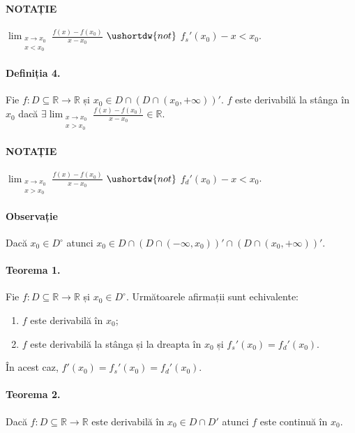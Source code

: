 \paragraph{NOTAȚIE}
$\displaystyle\lim_{\substack{x \rightarrow x_{0} \\ x<x_{0}}} \frac{f(x) - f(x_{0})}{x-x_{0}}$ $\ushortdw{not}$ $f_{s}'(x_{0})-x < x_{0}$.

\paragraph{Definiția 4.}
Fie $f:D \subseteq \mathbb{R} \rightarrow \mathbb{R}$ și $x_{0} \in D \cap (D \cap (x_{0}, +\infty))'$. $f$ este derivabilă la stânga în $x_{0}$ dacă
$\exists \displaystyle\lim_{\substack{x \rightarrow x_{0} \\ x>x_{0}}} \frac{f(x) - f(x_{0})}{x-x_{0}} \in \mathbb{R}$.

\paragraph{NOTAȚIE}
$\displaystyle\lim_{\substack{x \rightarrow x_{0} \\ x>x_{0}}} \frac{f(x) - f(x_{0})}{x-x_{0}}$ $\ushortdw{not}$ $f_{d}'(x_{0})-x < x_{0}$.

\paragraph{Observație}
Dacă $x_{0} \in D^{\circ}$ atunci $x_{0} \in D \cap (D \cap (-\infty, x_{0}))' \cap (D \cap (x_{0}, +\infty))'$.

\paragraph{Teorema 1.}
Fie $f:D \subseteq \mathbb{R} \rightarrow \mathbb{R}$ și $x_{0} \in D^{\circ}$. Următoarele afirmații sunt echivalente:
\begin{enumerate}[label=\emph{\alph*})]
	\item $f$ este derivabilă în $x_{0}$;
	\item $f$ este derivabilă la stânga și la dreapta în $x_{0}$ și $f_{s}'(x_{0}) = f_{d}'(x_{0})$.
\end{enumerate}
În acest caz, $f'(x_{0}) = f_{s}'(x_{0}) = f_{d}'(x_{0})$.

\paragraph{Teorema 2.}
Dacă $f:D \subseteq \mathbb{R} \rightarrow \mathbb{R}$ este derivabilă în $x_{0} \in D \cap D'$ atunci $f$ este continuă în $x_{0}$.

